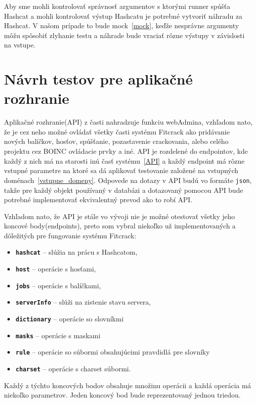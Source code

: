 Aby sme mohli kontrolovať správnosť argumentov s ktorými runner spúšťa Hashcat a mohli kontrolovať výstup Hashcatu je potrebné vytvoriť náhradu za Hashcat.
V našom prípade to bude mock~\ref{mock}, keďže nesprávne argumenty môžu spôsobiť zlyhanie testu a náhrade bude vraciať rôzne výstupy v závislosti na vstupe.


\section{Návrh testov pre aplikačné rozhranie}
\label{navrh_API}
Aplikačné rozhranie(API) z časti nahradzuje funkciu webAdmina, vzhľadom nato, že je cez neho možné ovládať všetky časti systému Fitcrack ako pridávanie nových balíčkov, hosťov, spúšťanie, pozastavenie crackovania, alebo celého projektu cez BOINC ovládacie prvky a iné.
API je rozdelené do endpointov, kde každý z nich má na starosti inú časť systému~\ref{API} a každý endpoint má rôzne vstupné parametre na ktoré sa dá aplikovať testovanie založené na vstupných doménach~\ref{vstupne_domeny}.
Odpovede na dotazy v API budú vo formáte \texttt{json}, takže pre každý objekt používaný v databázi a dotazovaný pomocou API bude potrebné implementovať ekvivalentný prevod ako to robí API.

Vzhľadom nato, že API je stále vo vývoji nie je možné otestovať všetky jeho koncové body(endpoints), preto som vybral niekoľko už implementovaných a dôležitých pre fungovanie systému Fitcrack:
\begin{itemize}
	\item \textbf{\texttt{hashcat}} -- slúžia na prácu s Hashcatom,
	\item \textbf{\texttt{host}} -- operácie s hosťami,
	\item \textbf{\texttt{jobs}} -- operácie s balíčkami,
	\item \textbf{\texttt{serverInfo}} -- slúži na zistenie stavu servera,
	\item \textbf{\texttt{dictionary}} -- operácie so slovníkmi
	\item \textbf{\texttt{masks}} -- operácie s maskami
	\item \textbf{\texttt{rule}} -- operácie so súbormi obsahujúcimi pravdidlá pre slovníky
	\item \textbf{\texttt{charset}} -- operácie s charset súbormi.
\end{itemize}
Každý z týchto koncových bodov obsahuje množinu operácii a každá operácia má niekoľko parametrov.
Jeden koncový bod bude reprezentovaný jednou triedou.

